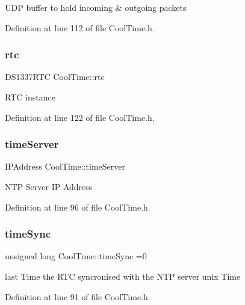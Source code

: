 U\+DP buffer to hold incoming \& outgoing packets 

Definition at line 112 of file Cool\+Time.\+h.

\mbox{\label{class_cool_time_abd38f2384ff90692b1568d9db869412e}} 
\subsubsection{\texorpdfstring{rtc}{rtc}}
{\footnotesize\ttfamily D\+S1337\+R\+TC Cool\+Time\+::rtc\hspace{0.3cm}{\ttfamily [private]}}

R\+TC instance 

Definition at line 122 of file Cool\+Time.\+h.

\mbox{\label{class_cool_time_ad2b9858f399108cb440dd1e908916f04}} 
\subsubsection{\texorpdfstring{time\+Server}{timeServer}}
{\footnotesize\ttfamily I\+P\+Address Cool\+Time\+::time\+Server\hspace{0.3cm}{\ttfamily [private]}}

N\+TP Server IP Address 

Definition at line 96 of file Cool\+Time.\+h.

\mbox{\label{class_cool_time_a9d032e76c3470a15b3bbbc52af6463f7}} 
\subsubsection{\texorpdfstring{time\+Sync}{timeSync}}
{\footnotesize\ttfamily unsigned long Cool\+Time\+::time\+Sync =0\hspace{0.3cm}{\ttfamily [private]}}

last Time the R\+TC syncronised with the N\+TP server unix Time 

Definition at line 91 of file Cool\+Time.\+h.

\mbox{\label{class_cool_time_ad33c2713c903ff064ad09c46406ae088}} 
